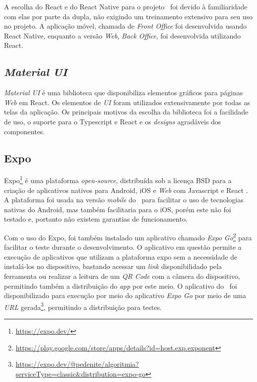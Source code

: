 A escolha do React e do React Native para o projeto \appName\ foi devido à familiaridade com elas por parte da dupla, não exigindo um treinamento extensivo para seu uso no projeto. A aplicação móvel, chamada de \textit{Front Office} foi desenvolvida usando React Native, enquanto a versão \textit{Web}, \textit{Back Office}, foi desenvolvida utilizando React.

\subsection{\textit{Material UI}}

\textit{Material UI} \cite{mui} é uma biblioteca que disponibiliza elementos gráficos para páginas \textit{Web} em React. Os elementos de \textit{UI} foram utilizados extensivamente por todas as telas da aplicação. Os principais motivos da escolha da biblioteca foi a facilidade de uso, o suporte para o Typescript e React e os \textit{designs} agradáveis dos componentes.

\subsection{Expo}

Expo\footnote{\url{https://expo.dev/}} é uma plataforma \textit{open-source}, distribuída sob a licença BSD para a criação de aplicativos nativos para Android, iOS e \textit{Web} com Javascript e React \cite{expo}. A plataforma foi usada na versão \textit{mobile} do \appName\ para facilitar o uso de tecnologias nativas do Android, mas também facilitaria para o iOS, porém este não foi testado e, portanto não existem garantias de funcionamento.

Com o uso do Expo, foi também instalado um aplicativo chamado \textit{Expo Go}\footnote{\url{https://play.google.com/store/apps/details?id=host.exp.exponent}} para facilitar o teste durante o desenvolvimento. O aplicativo em questão permite a execução de aplicativos que utilizam a plataforma expo sem a necessidade de instalá-los no dispositivo, bastando acessar um \textit{link} disponibilidado pela ferramenta ou realizar a leitura de um \textit{QR Code} com a câmera do dispositivo, permitindo também a distribuição do \textit{app} por este meio. O aplicativo do \appName\ foi disponibilizado para execução por meio do aplicativo \textit{Expo Go} por meio de uma \textit{URL} gerada\footnote{\url{https://expo.dev/@pedenite/algoritmia?serviceType=classic&distribution=expo-go}}, permitindo a distribuição para testes.

